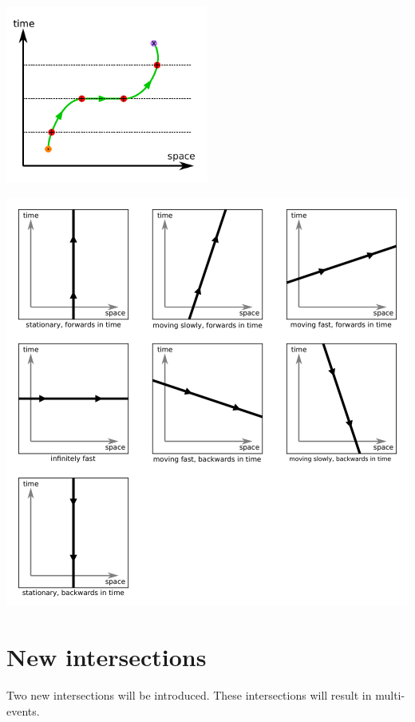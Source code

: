 \includegraphics[width = 0.5\textwidth]{Time/infinitely_fast_point}

\begin{center}
\includegraphics[width = \textwidth]{Time/world_line_interpretations}
\end{center}





\section{New intersections}  

Two new intersections will be introduced. These intersections will result in multi-events. 



